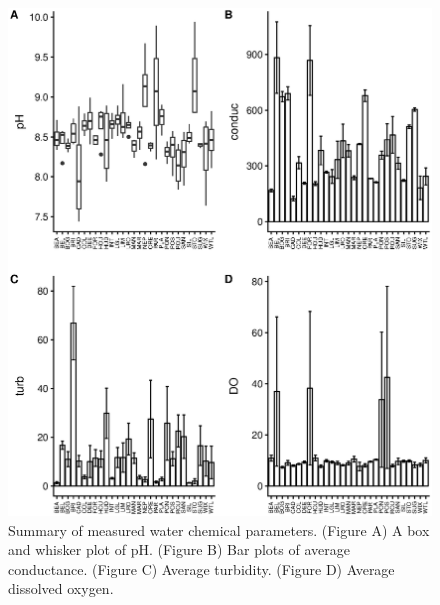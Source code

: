 \begin{figure}[!hp]
\centering
\includegraphics[width=\textwidth]{figures/watboxplotlake.eps}
\caption{Summary of measured water chemical parameters. (Figure A) A box and whisker plot of pH. (Figure B) Bar plots of average conductance. (Figure C) Average turbidity. (Figure D) Average dissolved oxygen. }
  \end{figure}

